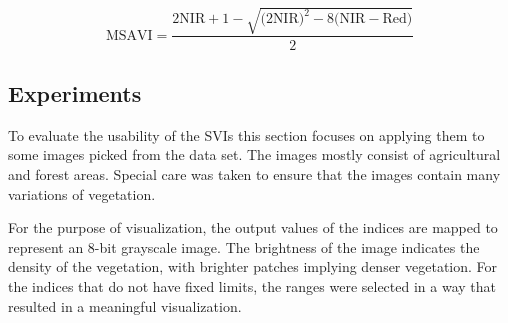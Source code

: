 \begin{equation}
    \displaystyle
    \text{MSAVI} = \frac
    {
    2 \text{NIR} + 1
    - \sqrt{
    \big(2 \text{NIR}\big)^2
    - 8 \big(\text{NIR} - \text{Red}\big)
    }
    }
    {2}
    \label{eq:msavi}
\end{equation}

\subsection{Experiments}
To evaluate the usability of the SVIs this section focuses on applying them to some images picked from the data set. The images mostly consist of agricultural and forest areas. Special care was taken to ensure that the images contain many variations of vegetation. 

For the purpose of visualization, the output values of the indices are mapped to represent an 8-bit grayscale image. The brightness of the image indicates the density of the vegetation, with brighter patches implying denser vegetation. For the indices that do not have fixed limits, the ranges were selected in a way that resulted in a meaningful visualization. 

